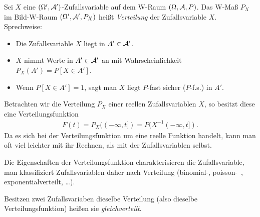 \begin{defn}
\label{defn:3.4}
Sei $X$ eine $(\Omega ', \AA')$-Zufallsvariable auf dem W-Raum
$(\Omega, \AA, P)$.
Das W-Maß $P_{X}$ im Bild-W-Raum $(\Omega ', \AA', P_{X})$ heißt
\emph{Verteilung} der Zufallsvariable $X$.\\
Sprechweise:
\begin{itemize}[label=-]
  \item Die Zufallsvariable $X$ liegt in $A'\in \AA'$.
  \item $X$ nimmt Werte in $A' \in \AA'$ an mit Wahrscheinlichkeit $P_{X}(A') =
  P[X \in A']$.
  \item Wenn $P[X \in A'] = 1$, sagt man $X$ liegt $P$-fast sicher
  ($P$-f.s.) in $A'$.\fishhere
\end{itemize}
\end{defn}

Betrachten wir die Verteilung $P_X$ einer reellen Zufallsvariablen $X$, so
besitzt diese eine Verteilungsfunktion
\begin{align*}
F(t) = P_X((-\infty,t]) = P(X^{-1}(-\infty,t]).
\end{align*}
Da es sich bei der Verteilungsfunktion um eine reelle Funktion
handelt, kann man oft viel leichter mit ihr Rechnen, als mit der
Zufallsvariablen selbst.

Die Eigenschaften der Verteilungsfunktion charakterisieren die Zufallsvariable,
man klassifiziert Zufallsvariablen daher nach Verteilung (binomial-, poisson-~,
exponentialverteilt, \ldots).

\begin{defnn}
Besitzen zwei Zufallsvariaben dieselbe Verteilung (also dieselbe
Verteilungsfunktion) heißen sie \emph{gleichverteilt}.\fishhere
\end{defnn}

